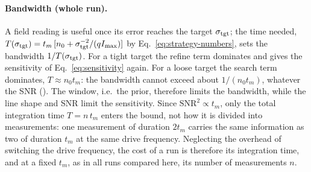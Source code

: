 \paragraph{Bandwidth (whole run).} A field reading is useful once its error reaches the target
$\sigma_{\rm tgt}$; the time needed, $T(\sigma_{\rm tgt})=t_m\,[n_0+\sigma_{\rm tgt}^{-2}/(qI_{\rm max})]$ by
Eq.~\eqref{eq:strategy-numbers}, sets the bandwidth $1/T(\sigma_{\rm tgt})$. For a tight target the refine term
dominates and gives the sensitivity of Eq.~\eqref{eq:sensitivity} again. For a loose target the search term
dominates, $T\approx n_0t_m$: the bandwidth cannot exceed about $1/(n_0t_m)$, whatever the SNR
(). The window, i.e.\ the prior, therefore limits the bandwidth, while the line shape and SNR limit
the sensitivity.
Since $\mathrm{SNR}^2\propto t_m$, only the total integration time $T=n\,t_m$ enters the bound, not how it is divided
into measurements: one measurement of duration $2t_m$ carries the same information as two of duration $t_m$ at the
same drive frequency. Neglecting the overhead of switching the drive frequency, the cost of a run is therefore its
integration time, and at a fixed $t_m$, as in all runs compared here, its number of measurements $n$.
